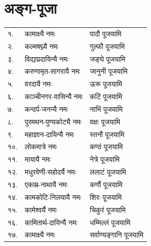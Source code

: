 \section{अङ्ग-पूजा}

\begin{longtable}{ll@{— }l}
१. & कामाक्ष्यै नमः & पादौ पूजयामि\\
२. & कल्मषघ्न्यै नमः & गुल्फौ पूजयामि\\
३. & विद्याप्रदायिन्यै नमः & जङ्घे पूजयामि\\
४. & करुणामृत-सागरायै नमः & जानुनी पूजयामि\\
५. & वरदायै नमः & ऊरू पूजयामि\\
६. & काञ्चीनगर-वासिन्यै नमः & कटिं पूजयामि\\
७. & कन्दर्प-जनन्यै नमः & नाभिं पूजयामि\\
८. & पुरमथन-पुण्यकोट्यै नमः& वक्षः पूजयामि\\
९. & महाज्ञान-दायिन्यै नमः & स्तनौ पूजयामि\\
१०. & लोकमात्रे नमः & कण्ठं पूजयामि\\
११. & मायायै नमः & नेत्रे पूजयामि\\
१२. & मधुरवेणी-सहोदर्यै नमः & ललाटं पूजयामि\\
१३. & एकाम्र-नाथायै नमः & कर्णौ पूजयामि\\
१४. & कामकोटि-निलयायै नमः & शिरः पूजयामि\\
१५. & कामेश्वर्यै नमः & चिकुरं पूजयामि\\
१६. & कामितार्थ-दायिन्यै नमः & धम्मिल्लं पूजयामि\\
१७. & कामाक्ष्यै नमः & सर्वाण्यङ्गानि पूजयामि\\
\end{longtable}

\begingroup
\centering
\setlength{\columnseprule}{1pt}
\let\chapt\sect
\needspace{6em}


\endgroup


